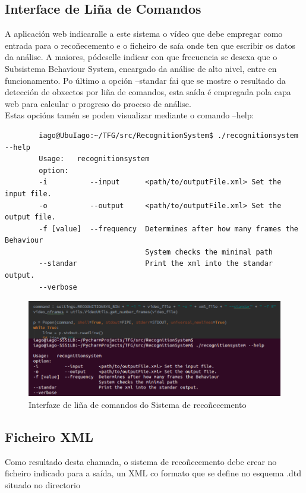 	\subsection{Interface de Liña de Comandos}
	A aplicación web indicaralle a este sistema o vídeo que debe empregar como entrada para o 
	recoñecemento e o ficheiro de saía onde ten que escribir os datos da análise. A maiores, pódeselle
	indicar con que frecuencia se desexa que o Subsistema Behaviour System, encargado da análise de
	alto nivel, entre en funcionamento. Po último a opción --standar fai que se mostre o resultado da
	detección de obxectos por liña de comandos, esta saída é empregada pola capa web para calcular o
	progreso do proceso de análise.\\
	
	Estas opcións tamén se poden visualizar mediante o comando --help:\\ 
	\begin{verbatim}
		iago@UbuIago:~/TFG/src/RecognitionSystem$ ./recognitionsystem --help
		Usage:   recognitionsystem
		option:  
		-i          --input      <path/to/outputFile.xml> Set the input file.
		-o          --output     <path/to/outputFile.xml> Set the output file.
		-f [value]  --frequency  Determines after how many frames the Behaviour 
		                         System checks the minimal path
		--standar                Print the xml into the standar output.
		--verbose
	\end{verbatim}
	
	\begin{figure}[htp]
	\begin{center}
		\includegraphics[scale=0.45]{figures/InterfazLineaComandos.png}
		\caption{Interfaze de liña de comandos do Sistema de recoñecemento}
	\label{fig:InterfazLineaComandos}
	\end{center}
	\end{figure}
	
	\subsection{Ficheiro XML}
		Como resultado desta chamada, o sistema de recoñecemento debe crear no ficheiro indicado 
		para a saída, un XML co formato que se define no esquema .dtd situado no directorio
		
